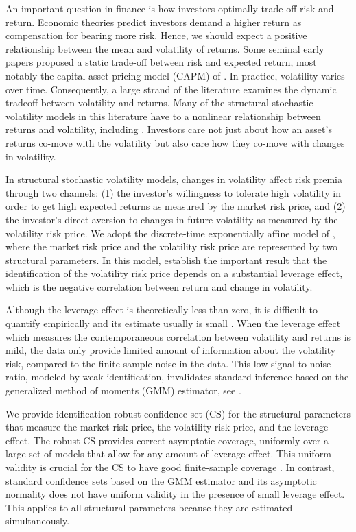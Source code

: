 \documentclass[11pt, letterpaper, twoside]{article}
\begin{document}
An important question in finance is how investors optimally trade off risk and return. Economic theories predict investors demand a higher return as compensation for bearing more risk. Hence, we should expect a positive relationship between the mean and volatility of returns. Some seminal early papers proposed a static trade-off between risk and expected return, most notably the capital asset pricing model (CAPM) of \textcites{sharpe1964capital,lintner1965security}. In practice, volatility varies over time. Consequently, a large strand of the literature examines the dynamic tradeoff between volatility and returns. Many of the structural stochastic volatility models in this literature have to a nonlinear relationship between returns and volatility, including \textcites{bansal2014volatility, dewbecker2017price}.  Investors care not just about how an asset's returns co-move with the volatility but also care how they co-move with changes in volatility. 

In structural stochastic volatility models, changes in volatility affect risk premia through two channels: (1) the investor's willingness to tolerate high volatility in order to get high expected returns as measured by the market risk price, and (2) the investor’s direct aversion to changes in future volatility as measured by the volatility risk price. We adopt the discrete-time exponentially affine model of \textcite{han2018leverage}, where the market risk price and the volatility risk price are represented by two structural parameters. In this model,  \textcite{han2018leverage} establish the important result that the identification of the volatility risk price depends on a substantial leverage effect, which is the negative correlation between return and change in volatility. 

Although the leverage effect is theoretically less than zero, it is difficult to quantify empirically and its estimate usually is small \parencites{aitsahalia2013leverage}. When the leverage effect which measures the contemporaneous correlation between volatility and returns is mild, the data only provide limited amount of information about the volatility risk, compared to the finite-sample noise in the data. This low signal-to-noise ratio,  modeled by weak identification, invalidates standard inference based on the generalized method of moments (GMM) estimator, see \textcites{stock2000GMM,andrews2012estimation}.

We provide identification-robust confidence set (CS) for the structural parameters that measure the market risk price, the volatility risk price, and the leverage effect. 
The robust CS provides correct asymptotic coverage, uniformly over a large set of models that allow for any amount of leverage effect. This uniform validity is crucial for the CS to have good finite-sample coverage \parencites{mikusheva2007uniform, andrews2010applications}. In contrast, standard confidence sets based on the GMM estimator and its asymptotic normality does not have uniform validity in the presence of small leverage effect. This applies to all structural parameters because they are estimated simultaneously.
\end{document}
